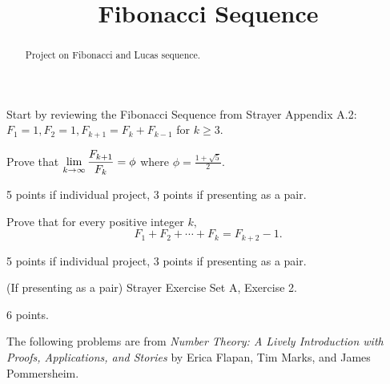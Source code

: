 \documentclass[letterpaper, 11 pt]{ximera}
\title{Fibonacci Sequence}
\begin{document}
\begin{abstract}
 Project on Fibonacci and Lucas sequence.
\end{abstract}
\maketitle

\begin{exploration}
 Start by reviewing the Fibonacci Sequence from Strayer Appendix A.2: 
 $F_1=1, F_2=1, F_{k+1}=F_k+F_{k-1}$ for $k\geq3.$ 
\begin{problem}
	Prove that $\displaystyle\lim_{k\to\infty}\frac{F_{k+1}}{F_k}=\phi$ where $\phi=\frac{1+\sqrt{5}}{2}.$
	
\begin{rubric} 5 points if individual project, 3 points if presenting as a pair.
\end{rubric}
\end{problem}

\begin{problem}
 	Prove that for every positive integer $k,$ 
	\[F_1+F_2+\cdots+F_k=F_{k+2}-1.\]
	
\begin{rubric} 5 points if individual project, 3 points if presenting as a pair.
\end{rubric}
\end{problem}

\begin{problem}(If presenting as a pair)
 	Strayer Exercise Set A, Exercise 2.
	\begin{rubric} 6 points.
\end{rubric}
\end{problem}

	
\end{exploration}

The following problems are from \emph{Number Theory: A Lively Introduction with Proofs, Applications, and Stories} by Erica Flapan, Tim Marks, and James Pommersheim.
\end{document}
